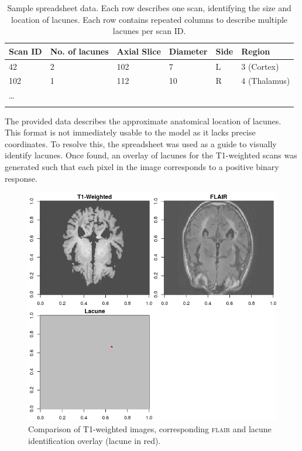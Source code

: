 \begin{table}[ht]
	\centering
	\begin{tabular}{llllll}
	\toprule[1.5pt]
	Scan ID & No. of lacunes & Axial Slice & Diameter & Side & Region\\
	\midrule
	42 & 2 & 102 & 7 & L & 3 (Cortex)\\
	102 & 1 & 112 & 10 & R & 4 (Thalamus)\\
	\ldots\\
	\bottomrule[1.5pt]\\
	\end{tabular}
	\caption{Sample spreadsheet data. Each row describes one scan, identifying the size and location of lacunes. Each row contains repeated columns to describe multiple lacunes per scan ID.}
	\label{data-excel-tab}
\end{table}

The provided data describes the approximate anatomical location of lacunes. This format is not immediately usable to the model as it lacks precise coordinates. To resolve this, the spreadsheet was used as a guide to visually identify lacunes. Once found, an overlay of lacunes for the T1-weighted scans was generated such that each pixel in the image corresponds to a positive binary response.

\begin{figure}[ht]
\centering
\includegraphics[width=\linewidth]{Images/6_lacune_mask.png}
\caption{Comparison of T1-weighted images, corresponding \textsc{flair} and lacune identification overlay (lacune in red).}
\label{data-t1-flair-lac}
\end{figure}

